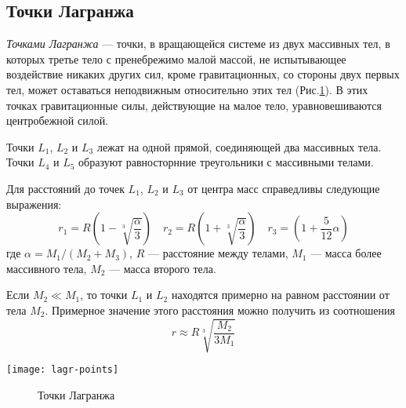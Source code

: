 \subsection{Точки Лагранжа}

{\itshape Точками Лагранжа} --- точки, в вращающейся системе из двух
массивных тел, в которых третье тело с пренебрежимо 
малой массой, не испытывающее воздействие никаких 
других сил, кроме гравитационных, со стороны двух 
первых тел, может оставаться неподвижным относительно 
этих тел (Рис.\ref{pic:lagr-points}). В этих точках гравитационные силы, действующие на малое тело, уравновешиваются центробежной силой.

Точки $L_1$, $L_2$ и $L_3$ лежат на одной прямой, 
соединяющей два массивных тела. Точки $L_4$ и $L_5$ 
образуют равносторнние треугольники с массивными 
телами.

Для расстояний до точек $L_1$, $L_2$ и $L_3$ от 
центра масс справедливы следующие выражения:
\begin{equation}r_1=R\left(1-\sqrt[3]{\frac{\alpha}
{3}}\right) \quad r_2=R\left(1+\sqrt[3]{\frac{\alpha}
{3}}\right) \quad r_3=\left(1+\frac{5}{12}\alpha\right)
\end{equation}
где $\alpha=M_1/(M_2+M_3)$, $R$ --- расстояние между 
телами, $M_1$ --- масса более массивного тела, $M_2$
 --- масса второго тела.

Если $M_2\ll M_1$, то точки $L_1$ и $L_2$ находятся 
примерно на равном расстоянии от тела $M_2$. 
Примерное значение этого расстояния можно получить
из соотношения
\begin{equation}r\approx R\sqrt[3]{\frac{M_2}{3M_1}}
\end{equation}
\begin{center}
\texttt{[image: lagr-points]}
\begin{figure}[h!]
\caption{Точки Лагранжа}\label{pic:lagr-points}
\end{figure}
\end{center}